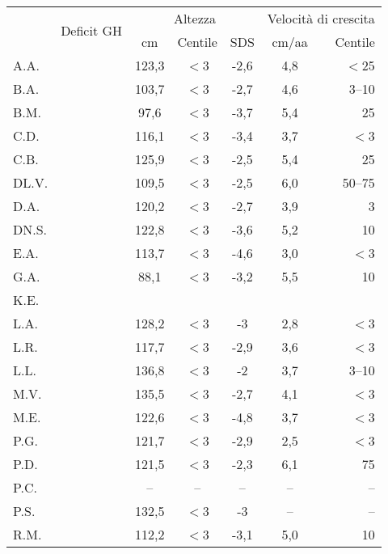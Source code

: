 \begin{table}[!h]
\begin{center}
\addtolength{\tabcolsep}{5pt}
\renewcommand{\arraystretch}{1.1}
\begin{tabular}{lcccccr}
\toprule
 & \multirow{2}{*}{Deficit GH} & \multicolumn{3}{c}{Altezza} & \multicolumn{2}{c}{Velocità di crescita} \\
 \cmidrule(r){3-5}  \cmidrule(r){6-7}
 &    							& cm    & Centile  & SDS & cm/aa & Centile \\
A.A.	&  				 		& 123,3 & $<$3  & -2,6 & 4,8 & $<$25  \\
B.A.	& \checkmark 	  				& 103,7 & $<$3  & -2,7 & 4,6 & 3--10   \\
B.M.	& \checkmark 	  				&  97,6 & $<$3  & -3,7 & 5,4 & 25     \\
C.D.	& \checkmark 	  				& 116,1 & $<$3  & -3,4 & 3,7 & $<$3   \\
C.B.	&  				 	        & 125,9 & $<$3  & -2,5 & 5,4 & 25     \\
DL.V.	& \checkmark 	  				& 109,5 & $<$3  & -2,5 & 6,0 & 50--75  \\
D.A.	&  				  		& 120,2 & $<$3  & -2,7 & 3,9 & 3      \\
DN.S.	& \checkmark 	  				& 122,8 & $<$3  & -3,6 & 5,2 & 10     \\
E.A.	&  				  		& 113,7 & $<$3  & -4,6 & 3,0 & $<$3   \\
G.A.	&  				  		&  88,1 & $<$3  & -3,2 & 5,5 & 10     \\
K.E.	&  				  		&       &       &      &     &    \\
L.A.	& \checkmark 	  				& 128,2 & $<$3  & -3   & 2,8 & $<$3   \\
L.R.	&  				  		& 117,7 & $<$3  & -2,9 & 3,6 & $<$3   \\
L.L.	&  				  		& 136,8 & $<$3  & -2   & 3,7 & 3--10   \\
M.V.	& \checkmark 	  				& 135,5 & $<$3  & -2,7 & 4,1 & $<$3   \\
M.E.	&  				  		& 122,6 & $<$3  & -4,8 & 3,7 & $<$3   \\
P.G.	& \checkmark 	  				& 121,7 & $<$3  & -2,9 & 2,5 & $<$3   \\
P.D.	&  				  		& 121,5 & $<$3  & -2,3 & 6,1 & 75     \\
P.C.	&  				  		& --    & --    & --   & --  & --     \\
P.S.	&  				  		& 132,5 & $<$3  & -3   & --  & --     \\
R.M.	& \checkmark 	  				& 112,2 & $<$3  & -3,1 & 5,0 & 10     \\

\end{tabular}
\end{center}
\end{table}
